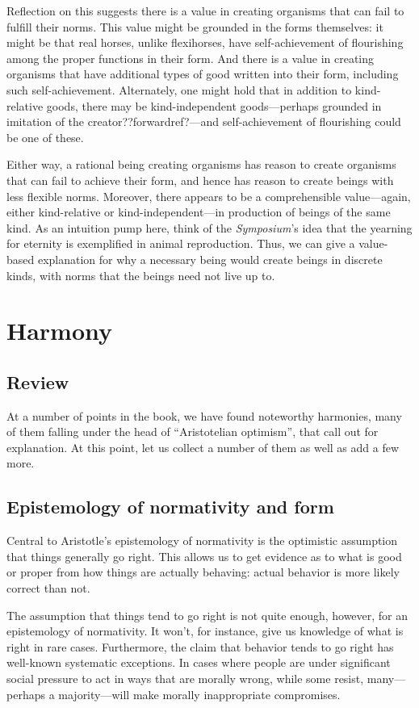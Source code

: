 Reflection on this suggests there is a value in creating organisms that can fail to fulfill their norms. This value might be
grounded in the forms themselves: it might be that real horses, unlike flexihorses, have self-achievement of flourishing among the
proper functions in their form. And there is a value in creating organisms that have additional types of good written into their
form, including such self-achievement. Alternately, one might hold that in addition to kind-relative goods, there may be
kind-independent goods---perhaps grounded in imitation of the creator??forwardref?---and self-achievement of flourishing
could be one of these. 

Either way, a rational being creating organisms has reason to create organisms that can fail to achieve their form, and hence
has reason to create beings with less flexible norms. Moreover, there appears to be a comprehensible value---again, either 
kind-relative or kind-independent---in production of beings of the same kind. As an intuition pump here, think of the
\textit{Symposium}'s idea that the yearning for eternity is exemplified in animal reproduction. Thus, we can give a value-based
explanation for why a necessary being would create beings in discrete kinds, with norms that the beings need not live up to.

\section{Harmony}
\subsection{Review}
At a number of points in the book, we have found noteworthy harmonies, many of them falling under the head of ``Aristotelian optimism'', that call out for explanation. At this point, let us collect a number of them as well as add a few more.

\subsection{Epistemology of normativity and form}\label{ch:epist-of-form}
Central to Aristotle's epistemology of normativity is the optimistic assumption that things generally go right.
This allows us to get evidence as to what is good or proper from how things are actually behaving: actual behavior 
is more likely correct than not.

The assumption that things tend to go right is not quite enough, however, for an epistemology of normativity. 
It won't, for instance, give us knowledge of what is right in rare cases. Furthermore, the claim that behavior
tends to go right has well-known systematic exceptions. In cases where people are under significant social pressure
to act in ways that are morally wrong, while some resist, many---perhaps a majority---will make morally inappropriate
compromises. 

